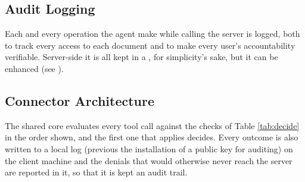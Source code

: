 \subsection{Audit Logging}
Each and every operation the agent make while calling the server is logged, both to track every access to each document and to make every user's accountability verifiable.
Server-side it is all kept in a , for simplicity's sake, but it can be enhanced (see ).


\subsection{Connector Architecture}
The shared core evaluates every tool call against the checks of Table \ref{tab:decide} in the order shown, and the first one that applies decides.
Every outcome is also written to a local log (previous the installation of a public key for auditing) on the client machine and the denials that would otherwise never reach the server are reported in it, so that it is kept an audit trail.

